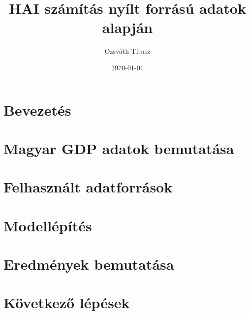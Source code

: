 \documentclass[a4paper,12pt]{report}
\title{HAI számítás nyílt forrású adatok alapján}
\author{Ozsváth Titusz}
\date{\today}
\begin{document}
\maketitle
\tableofcontents
\newpage

\chapter{Bevezetés}


\chapter{Magyar GDP adatok bemutatása}


\chapter{Felhasznált adatforrások}


\chapter{Modellépítés}


\chapter{Eredmények bemutatása}


\chapter{Következő lépések}

\end{document}
